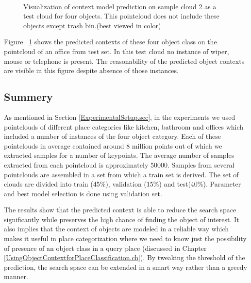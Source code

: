 \begin{figure} [htp]
\begin{center}
     \\
  \end{center}
  \caption[Visualization of context model prediction on sample cloud 2 as a test cloud.]
  {Visualization of context model prediction on sample cloud 2 as a test cloud for four objects. This pointcloud does not include 
  these objects except trash bin.(best viewed in color)}
  \label{ContextPrediction_Test_512.figure:edge}
\end{figure}

Figure ~\ref{ContextPrediction_Test_512.figure:edge} shows the predicted contexts of these four object class on the 
pointcloud of an office from test set.
In this test cloud no instance of wiper, mouse or telephone is present.
The reasonability of the predicted object contexts are visible in this figure despite absence of those instances.

\subsection*{Summery}
As mentioned in Section \ref{ExperimentalSetup.sec}, in the experiments we used pointclouds of different place categories like 
kitchen, bathroom and offices which included a number of instances of the four object category.
Each of these pointclouds in average contained around 8 million points out of which we extracted samples for a number of keypoints.
The average number of samples extracted from each pointcloud is approximately 50000.
Samples from several pointclouds are assembled in a set from which a train set is derived.
The set of clouds are divided into train (45\%), validation (15\%) and test(40\%).
Parameter and best model selection is done using validation set.

The results show that the predicted context is able to reduce the search space significantly while preserves the high chance of
finding the object of interest.
It also implies that the context of objects are modeled in a reliable way which makes it useful in place categorization where
we need to know just the possibility of presence of an object class in a query place (discussed in Chapter \ref{UsingObjectContextforPlaceClassification.ch}).
By tweaking the threshold of the prediction, the search space can be extended in a smart way rather than a greedy manner.

